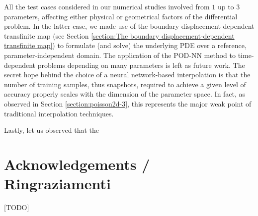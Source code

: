 \documentclass[12pt, a4paper, twoside, openright, notitlepage]{report}
\numberwithin{equation}{chapter}
\theoremstyle{theorem}
\theoremstyle{definition}
\theoremstyle{remark}
\theoremstyle{proposition}
\numberwithin{figure}{chapter}
\begin{document}
		All the test cases considered in our numerical studies involved from $1$ up to $3$ parameters, affecting either physical or geometrical factors of the differential problem. In the latter case, we made use of the boundary displacement-dependent transfinite map (see Section \ref{section:The boundary displacement-dependent transfinite map}) to formulate (and solve) the underlying PDE over a reference, parameter-independent domain. The application of the POD-NN method to time-dependent problems depending on many parameters is left as future work. The secret hope behind the choice of a neural network-based interpolation is that the number of training samples, thus snapshots, required to achieve a given level of accuracy properly scales with the dimension of the parameter space. In fact, as observed in Section \ref{section:poisson2d-3}, this represents the major weak point of traditional interpolation techniques.
		
		Lastly, let us observed that the 
		
	\chapter*{Acknowledgements / Ringraziamenti}
	
		[TODO]
		
\end{document}

